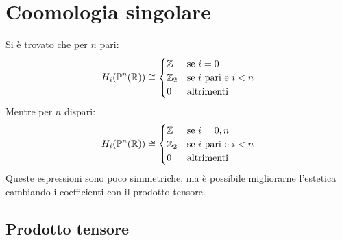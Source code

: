 \chapter{Coomologia singolare}


Si è trovato che per $ n $ pari:
\[
  H_i(\mathbb{P}^{n} (\mathbb{R})) \cong
  \begin{cases}
    \mathbb{Z} & \text{se } i = 0 \\
    \mathbb{Z}_2 & \text{se $ i $ pari e $ i < n $} \\
    0 & \text{altrimenti}
  \end{cases}
\]
Mentre per $ n $ dispari:
\[
  H_i(\mathbb{P}^{n} (\mathbb{R})) \cong
  \begin{cases}
    \mathbb{Z} & \text{se } i = 0,n \\
    \mathbb{Z}_2 & \text{se $ i $ pari e $ i < n $} \\
    0 & \text{altrimenti}
  \end{cases}
\]
Queste espressioni sono poco simmetriche, ma è possibile
migliorarne l'estetica cambiando i coefficienti con il
prodotto tensore.

\section{Prodotto tensore}

